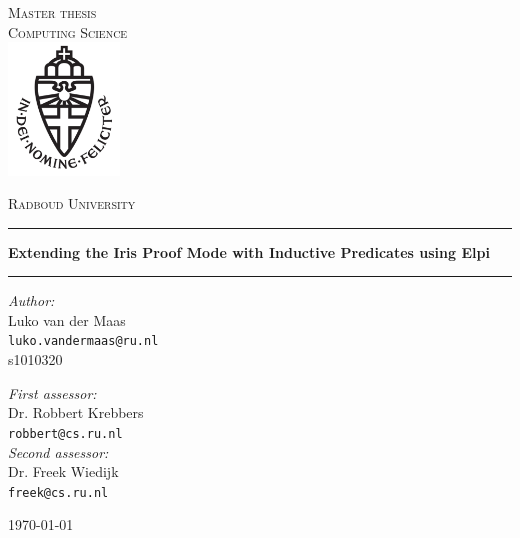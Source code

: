 \documentclass[11pt]{report}
\begin{document}
\VerbatimFootnotes

\renewcommand{\sectionautorefname}{Section}
\renewcommand{\subsectionautorefname}{Section}
\renewcommand{\chapterautorefname}{Chapter}

\begin{titlepage}
    \begin{center}
        \textsc{\LARGE Master thesis\\Computing Science}\\[1.5cm]
        \includegraphics[height=100pt]{logo}

        \vspace{0.4cm}
        \textsc{\Large Radboud University}\\[1cm]
        \hrule
        \vspace{0.4cm}
        \textbf{\huge Extending the Iris Proof Mode with Inductive Predicates using Elpi}\\[0.4cm]
        \hrule
        \vspace{2cm}
        \begin{minipage}[t]{0.45\textwidth}
            \begin{flushleft} \large
                \textit{Author:}\\
                Luko van der Maas\\
                \texttt{luko.vandermaas@ru.nl}\\
                s1010320
            \end{flushleft}
        \end{minipage}
        \begin{minipage}[t]{0.45\textwidth}
            \begin{flushright} \large
                \textit{First assessor:}\\
                Dr. Robbert Krebbers\\
                \texttt{robbert@cs.ru.nl}\\[1.3cm]
                \textit{Second assessor:}\\
                Dr. Freek Wiedijk\\
                \texttt{freek@cs.ru.nl}
            \end{flushright}
        \end{minipage}
        \vfill
        {\large \today}
    \end{center}
\end{titlepage}
\end{document}
